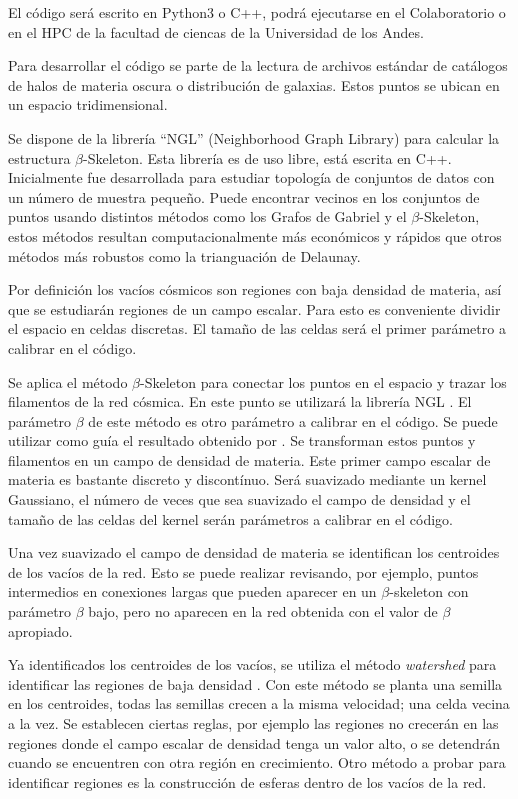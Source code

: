 \documentclass[preprint]{aastex62}
\begin{document}
  El código será escrito en Python3 o C++, podrá ejecutarse en el Colaboratorio o en el HPC de la
  facultad de ciencas de la Universidad de los Andes.
  
  Para desarrollar el código se parte de la lectura de archivos estándar de catálogos de halos
  de materia oscura o distribución de galaxias. Estos puntos se ubican en un espacio tridimensional.

  Se dispone de la librería ``NGL''\citep{ngl} (Neighborhood Graph Library)
  para calcular la estructura $\beta$-Skeleton. Esta librería es de uso libre, está escrita en C++.
  Inicialmente fue desarrollada para estudiar topología de conjuntos de datos con un número de muestra
  pequeño. Puede encontrar vecinos en los conjuntos de puntos usando distintos métodos como los
  Grafos de Gabriel y el $\beta$-Skeleton, estos métodos resultan computacionalmente más económicos
  y rápidos que otros métodos más robustos como la trianguación de Delaunay.
  
  Por definición los vacíos cósmicos son regiones con baja densidad de materia, así que se
  estudiarán regiones de un campo escalar. Para esto es conveniente dividir el espacio en
  celdas discretas. El tamaño de las celdas será el primer parámetro a calibrar en el código.
  
  Se aplica el método $\beta$-Skeleton para conectar los puntos en el espacio y trazar los
  filamentos de la red cósmica. En este punto se utilizará la librería NGL \citep{ngl}.
  El parámetro $\beta$ de este método es otro parámetro a calibrar en el código. Se puede
  utilizar como guía el resultado obtenido por \citet{Fang2018}.
  Se transforman estos puntos y filamentos en un campo de densidad de materia. Este primer
  campo escalar de materia es bastante discreto y discontínuo. Será suavizado mediante un
  kernel Gaussiano, el número de veces que sea suavizado el campo de densidad y el tamaño de
  las celdas del kernel serán parámetros a calibrar en el código.

  Una vez suavizado el campo de densidad de materia se identifican los centroides
  de los vacíos de la red. Esto se puede realizar revisando, por ejemplo, puntos intermedios
  en conexiones largas que pueden aparecer en un $\beta$-skeleton con parámetro $\beta$ bajo,
  pero no aparecen en la red obtenida con el valor de $\beta$ apropiado.

  Ya identificados los centroides de los vacíos, se utiliza el método \textit{watershed}
  para identificar las regiones de baja densidad \citep{Sutter2015}. Con este método
  se planta una semilla en los centroides, todas las semillas crecen a la misma velocidad; una
  celda vecina a la vez. Se establecen ciertas reglas, por ejemplo las regiones no crecerán en
  las regiones donde el campo escalar de densidad tenga un valor alto, o se detendrán cuando
  se encuentren con otra región en crecimiento. Otro método a probar para identificar regiones
  es la construcción de esferas dentro de los vacíos de la red. 
\end{document}
